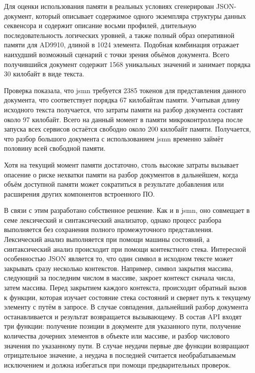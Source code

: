 \documentclass{report}
\begin{document}
Для оценки использования памяти в реальных условиях сгенерирован JSON-документ, который описывает содержимое одного экземпляра структуры данных секвенсора и содержит описание восьми профилей, длительную последовательность логических уровней, а также полный образ оперативной памяти для AD9910, длиной в 1024 элемента. Подобная комбинация отражает наихудший возможный сценарий с точки зрения объёмов документа. Всего получившийся документ содержит 1568 уникальных значений и занимает порядка 30 килобайт в виде текста.

Проверка показала, что jsmn требуется 2385 токенов для представления данного документа, что соответствует порядка 67 килобайтам памяти. Учитывая длину исходного текста получается, что затраты памяти на разбор документа составят около 97 килобайт. Всего на данный момент в памяти микроконтроллера после запуска всех сервисов остаётся свободно около 200 килобайт памяти. Получается, что разбор большого документа с использованием jsmn временно займёт половину всей свободной памяти.

Хотя на текущий момент памяти достаточно, столь высокие затраты вызывает опасение о риске нехватки памяти на разбор документов в дальнейшем, когда объём доступной памяти может сократиться в результате добавления или расширения других компонентов встроенного ПО.

В связи с этим разработано собственное решение. Как и в jsmn, оно совмещает в семе лексический и синтаксический анализатор, однако процесс разбора выполняется без сохранения полного промежуточного представления. Лексический анализ выполняется при помощи машины состояний, а синтаксический анализ происходит при помощи контекстного стека. Интересной особенностью JSON является то, что один символ в исходном тексте может закрывать сразу несколько контекстов. Например, символ закрытия массива, следующий за последним числом в массиве, закроет контекст сначала числа, затем массива. Перед закрытием каждого контекста, происходит обратный вызов к функции, которая изучает состояние стека состояний и сверяет путь к текущему элементу с путём в запросе. В случае совпадения, дальнейший разбор документа останавливается и результат возвращается вызывающему. В состав API входят три функции: получение позиции в документе для указанного пути, получение количества дочерних элементов в объекте или массиве, и разбор числового значения по указанному пути. В случае неудачи первые две функции возвращают отрицательное значение, а неудача в последней считается необрабатываемым исключением и должна избегаться при помощи предварительных проверок.
\end{document}
